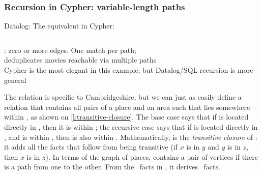 \begin{frame}
    \label{s:cypher-recursion}
    \frametitle{Recursion in Cypher: variable-length paths}
    Datalog:
    \vspace{1.2em}
    The equivalent in Cypher:
    \inputminted[fontsize=\footnotesize]{cypher}{code/datalog-cambs.cypher}
    \vspace{0.3em}
    : zero or more edges. One match per path;\\
     deduplicates movies reachable via multiple paths\\[1em]
    Cypher is the most elegant in this example, but Datalog/SQL recursion is more general
\end{frame}
\label{l:cypher-recursion}

The relation  is specific to Cambridgeshire, but we can just as easily define a relation  that contains all pairs of a place  and an area  such that  lies somewhere within , as shown on \autoref{l:transitive-closure}.
The base case says that if  is located directly in , then it is within ; the recursive case says that if  is located directly in , and  is within , then  is also within .
Mathematically,  is the \emph{transitive closure} of : it adds all the facts that follow from  being transitive (if $x$ is in $y$ and $y$ is in $z$, then $x$ is in $z$).
In terms of the graph of places,  contains a pair of vertices if there is a path from one to the other.
From the \reclocatedin\ facts in , it derives \recwithin\ facts.

